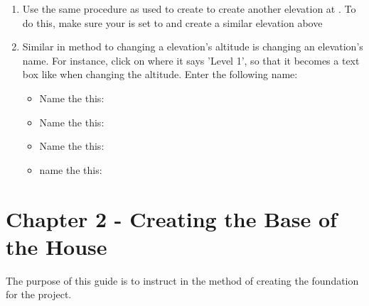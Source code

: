 \documentclass{tufte-book} %
\begin{document}
\begin{enumerate}
	\item Use the same procedure as used to create  to create another elevation at . To do this, make sure your  is set to  and create a similar elevation above 
	\item Similar in method to changing a elevation's altitude is changing an elevation's name. For instance, click on  where it says 'Level 1', so that it becomes a text box like when changing the altitude. Enter the following name: 
	\begin{itemize}
		\item Name the  this: 
		\item Name the  this: 
		\item Name the  this: 
		\item name the  this: 
	\end{itemize}
\end{enumerate}

\chapter{Chapter 2 - Creating the Base of the House}
The purpose of this guide is to instruct in the method of creating the foundation for the project.
\end{document}
